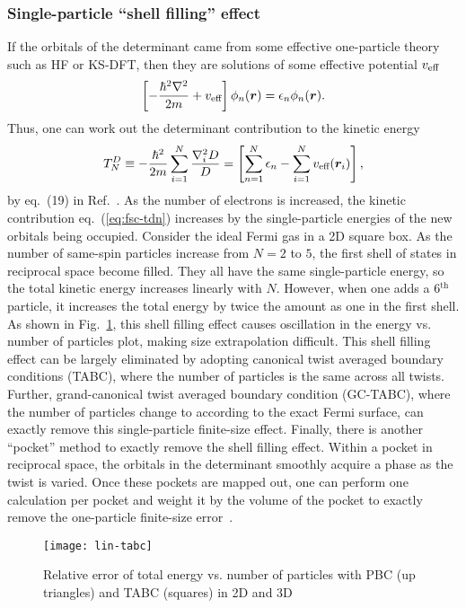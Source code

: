 \subsubsection{Single-particle ``shell filling'' effect}
If the orbitals of the determinant came from some effective one-particle theory such as HF or KS-DFT, then they are solutions of some effective potential $v_{\text{eff}}$
\begin{align}
\left[
-\dfrac{\hbar^2\nabla^2}{2m} + v_{\text{eff}}
\right] \phi_n(\boldsymbol{r}) = \epsilon_n\phi_n(\boldsymbol{r}).
\end{align}
Thus, one can work out the determinant contribution to the kinetic energy
\begin{align} \label{eq:fsc-tdn}
T^D_N \equiv -\dfrac{\hbar^2}{2m}\sum\limits_{i=1}^N \dfrac{\nabla_i^2D}{D} = \left[
\sum\limits_{n=1}^N\epsilon_n - \sum\limits_{i=1}^N v_{\text{eff}}(\boldsymbol{r}_i)
\right],
\end{align}
by eq.~(19) in Ref.~\cite{Holzmann2016}. As the number of electrons is increased, the kinetic contribution eq.~(\ref{eq:fsc-tdn}) increases by the single-particle energies of the new orbitals being occupied. Consider the ideal Fermi gas in a 2D square box. As the number of same-spin particles increase from $N=2$ to $5$, the first shell of states in reciprocal space become filled. They all have the same single-particle energy, so the total kinetic energy increases linearly with $N$. However, when one adds a 6$^{\text{th}}$ particle, it increases the total energy by twice the amount as one in the first shell. As shown in Fig.~\ref{fig:fsc-lin-tabc}, this shell filling effect causes oscillation in the energy vs. number of particles plot, making size extrapolation difficult. This shell filling effect can be largely eliminated by adopting canonical twist averaged boundary conditions (TABC), where the number of particles is the same across all twists. Further, grand-canonical twist averaged boundary condition (GC-TABC), where the number of particles change to according to the exact Fermi surface, can exactly remove this single-particle finite-size effect. Finally, there is another ``pocket'' method to exactly remove the shell filling effect. Within a pocket in reciprocal space, the orbitals in the determinant smoothly acquire a phase as the twist is varied. Once these pockets are mapped out, one can perform one calculation per pocket and weight it by the volume of the pocket to exactly remove the one-particle finite-size error~\cite{Holzmann2016}.

\begin{figure}[h]
\centering
\texttt{[image: lin-tabc]}
\caption{Relative error of total energy vs. number of particles with PBC (up triangles) and TABC (squares) in 2D and 3D~\cite{Lin2001}}
\label{fig:fsc-lin-tabc}
\end{figure}

